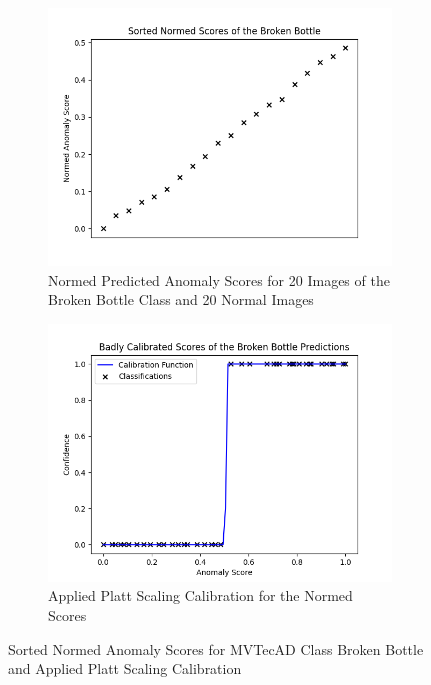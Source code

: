 \begin{figure}[htbp]
    \centering
    \begin{subfigure}[b]{0.4\textwidth}
        \includegraphics[width=\textwidth]{figures/anomaly_scores_sorted.png}
        \caption{Normed Predicted Anomaly Scores for 20 Images of the Broken Bottle Class and 20 Normal Images}
        \label{fig:scoresNormed}
    \end{subfigure}
    \hfill
    \begin{subfigure}[b]{0.4\textwidth}
        \includegraphics[width=\textwidth]{figures/anomaly_calibration_step.png}
        \caption{Applied Platt Scaling Calibration for the Normed Scores}
        \label{fig:platt}
    \end{subfigure}
    \caption{Sorted Normed Anomaly Scores for MVTecAD Class Broken Bottle and Applied Platt Scaling Calibration}
    \label{fig:badCal}
\end{figure}

